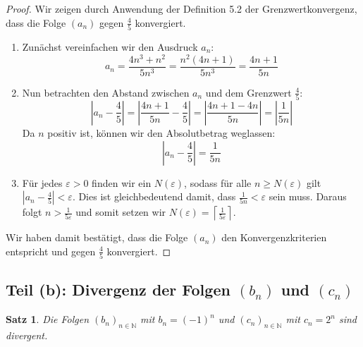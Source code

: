 \documentclass{article}
\newtheorem*{theorem}{Satz}
\theoremstyle{definition}
\theoremstyle{remark}
\begin{document}
\begin{proof}
	Wir zeigen durch Anwendung der Definition 5.2 der Grenzwertkonvergenz, dass die Folge \((a_n)\) gegen \(\frac{4}{5}\) konvergiert.

	\begin{enumerate}
		\item Zunächst vereinfachen wir den Ausdruck \(a_n\):
		      \[ a_n = \frac{4n^3 + n^2}{5n^3} = \frac{n^2(4n + 1)}{5n^3} = \frac{4n + 1}{5n} \]

		\item Nun betrachten den Abstand zwischen \(a_n\) und dem Grenzwert \(\frac{4}{5}\):
		      \[ |a_n - \frac{4}{5}| = \left| \frac{4n + 1}{5n} - \frac{4}{5} \right| = \left| \frac{4n + 1 - 4n}{5n} \right| = \left| \frac{1}{5n} \right| \]
		      Da \(n\) positiv ist, können wir den Absolutbetrag weglassen:
		      \[ |a_n - \frac{4}{5}| = \frac{1}{5n} \]

		\item Für jedes \(\varepsilon > 0\) finden wir ein \(N(\varepsilon)\), sodass für alle \(n \geq N(\varepsilon)\) gilt \(|a_n - \frac{4}{5}| < \varepsilon\). Dies ist gleichbedeutend damit, dass \(\frac{1}{5n} < \varepsilon\) sein muss. Daraus folgt \(n > \frac{1}{5\varepsilon}\) und somit setzen wir \(N(\varepsilon) = \left\lceil \frac{1}{5\varepsilon} \right\rceil\).
	\end{enumerate}
	Wir haben damit bestätigt, dass die Folge \((a_n)\) den Konvergenzkriterien entspricht und gegen \(\frac{4}{5}\) konvergiert.
\end{proof}

\subsection*{Teil (b): Divergenz der Folgen \((b_n)\) und \((c_n)\)}
\begin{theorem}
	Die Folgen \((b_n)_{n\in\mathbb{N}}\) mit \(b_n = (-1)^n\) und \((c_n)_{n\in\mathbb{N}}\) mit \(c_n = 2^n\) sind divergent.
\end{theorem}
\end{document}
